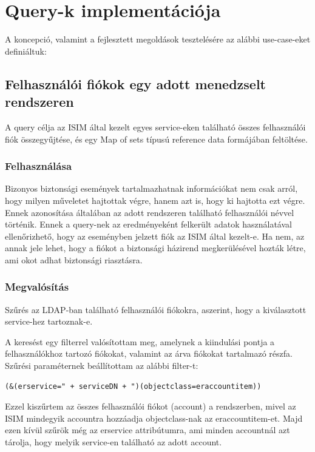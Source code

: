 \section{Query-k implementációja} \label{sec:queryk}

A koncepció, valamint a fejlesztett megoldások tesztelésére az alábbi use-case-eket definiáltuk:

\subsection{Felhasználói fiókok egy adott menedzselt rendszeren}
	A query célja az ISIM által kezelt egyes service-eken található összes felhasználói fiók összegyűjtése, és egy Map of sets típusú reference data formájában feltöltése. 
	\subsubsection{Felhasználása} 
		Bizonyos biztonsági események tartalmazhatnak információkat nem csak arról, hogy milyen műveletet hajtottak végre, hanem azt is, hogy ki hajtotta ezt végre. Ennek azonosítása általában az adott rendszeren található felhasználói névvel történik. Ennek a query-nek az eredményeként felkerült adatok használatával ellenőrizhető, hogy az eseményben jelzett fiók az ISIM által kezelt-e. Ha nem, az annak jele lehet, hogy a fiókot a biztonsági házirend megkerülésével hozták létre, ami okot adhat biztonsági riasztásra.
		 
	\subsubsection{Megvalósítás}
		Szűrés az LDAP-ban található felhasználói fiókokra, aszerint, hogy a kiválasztott service-hez tartoznak-e.
		
		A keresést egy filterrel valósítottam meg, amelynek a kiindulási pontja a felhasználókhoz tartozó fiókokat, valamint az árva fiókokat tartalmazó részfa. Szűrési paraméternek beállítottam az alábbi filter-t: 
\begin{lstlisting}
(&(erservice=" + serviceDN + ")(objectclass=eraccountitem))
\end{lstlisting}
	Ezzel kiszűrtem az összes felhasználói fiókot (account) a rendszerben, mivel az ISIM mindegyik accountra hozzáadja objectclass-nak az eraccountitem-et. Majd ezen kívül szűrök még az erservice attribútumra, ami minden accountnál azt tárolja, hogy melyik service-en található az adott account.
	
